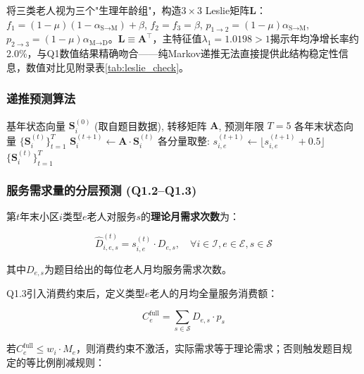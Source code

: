 将三类老人视为三个"生理年龄组"，构造$3\times 3$ Leslie矩阵$\mathbf{L}$\cite{leslie1945}：$f_1=(1-\mu)(1-\alpha_{\text{S}\to\text{M}})+\beta$, $f_2=f_3=\beta$, $p_{1\to2}=(1-\mu)\alpha_{\text{S}\to\text{M}}$, $p_{2\to3}=(1-\mu)\alpha_{\text{M}\to\text{D}}$。$\mathbf{L}\equiv\mathbf{A}^\top$，主特征值$\lambda_1=1.0198>1$揭示年均净增长率约2.0\%，与Q1数值结果精确吻合——纯Markov递推无法直接提供此结构稳定性信息，数值对比见附录表\ref{tab:leslie_check}。

\subsubsection{递推预测算法}

\begin{algorithm}[H]
\caption{老年人口5年递推预测}
\label{alg:markov}
\begin{algorithmic}[1]
\Require 基年状态向量 $\mathbf{S}_i^{(0)}$ (取自题目数据), 转移矩阵 $\mathbf{A}$, 预测年限 $T=5$
\Ensure 各年末状态向量 $\{\mathbf{S}_i^{(t)}\}_{t=1}^{T}$
        \State $\mathbf{S}_i^{(t+1)} \gets \mathbf{A} \cdot \mathbf{S}_i^{(t)}$
        \State 各分量取整: $s_{i,e}^{(t+1)} \gets \lfloor s_{i,e}^{(t+1)} + 0.5 \rfloor$
    \EndFor
\EndFor
\Return $\{\mathbf{S}_i^{(t)}\}_{t=1}^{T}$
\end{algorithmic}
\end{algorithm}

\subsubsection{服务需求量的分层预测 (Q1.2--Q1.3)}

第$t$年末小区$i$类型$e$老人对服务$s$的\textbf{理论月需求次数}为：

\begin{equation}
\hat{D}_{i,e,s}^{(t)} = s_{i,e}^{(t)} \cdot D_{e,s}, \quad \forall i\in\mathcal{I}, e\in\mathcal{E}, s\in\mathcal{S}
\end{equation}

其中$D_{e,s}$为题目给出的每位老人月均服务需求次数。

Q1.3引入消费约束后，定义类型$e$老人的月均全量服务消费额：

\begin{equation}
C_e^{\text{full}} = \sum_{s\in\mathcal{S}} D_{e,s} \cdot p_s
\end{equation}

若$C_e^{\text{full}} \le w_i \cdot M_e$，则消费约束不激活，实际需求等于理论需求；否则触发题目规定的等比例削减规则：

